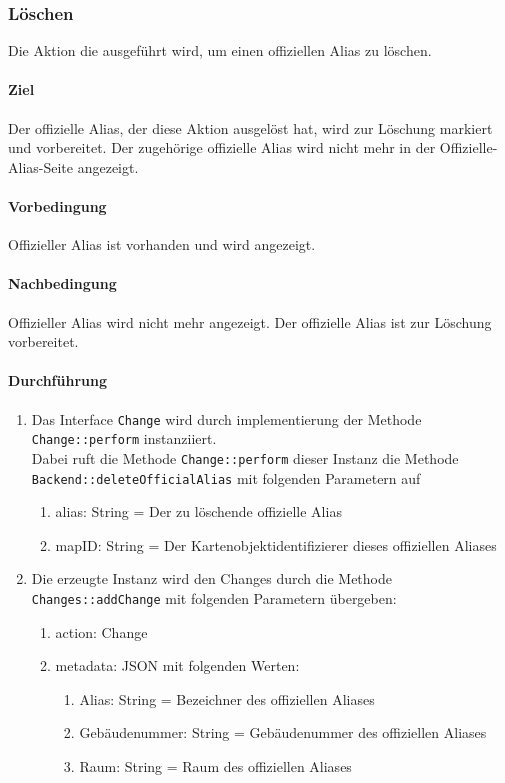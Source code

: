\subsubsection{Löschen}

Die Aktion die ausgeführt wird, um einen offiziellen Alias zu löschen.

\paragraph*{Ziel}
Der offizielle Alias, der diese Aktion ausgelöst hat, wird zur Löschung markiert und vorbereitet.
Der zugehörige offizielle Alias wird nicht mehr in der Offizielle-Alias-Seite angezeigt.

\paragraph*{Vorbedingung}
Offizieller Alias ist vorhanden und wird angezeigt.

\paragraph*{Nachbedingung}
Offizieller Alias wird nicht mehr angezeigt. Der offizielle Alias ist zur Löschung vorbereitet.

\paragraph*{Durchführung}
\begin{enumerate}
    \item Das Interface \verb#Change# wird durch implementierung der Methode \verb#Change::perform# instanziiert. \\
          Dabei ruft die Methode \verb#Change::perform# dieser Instanz die Methode \verb#Backend::deleteOfficialAlias# mit folgenden Parametern auf \begin{enumerate}
              \item alias: String = Der zu löschende offizielle Alias
              \item mapID: String = Der Kartenobjektidentifizierer dieses offiziellen Aliases
          \end{enumerate}
    \item Die erzeugte Instanz wird den Changes durch die Methode \verb#Changes::addChange# mit folgenden Parametern übergeben: \begin{enumerate}
        \item action: Change
        \item metadata: JSON mit folgenden Werten: \begin{enumerate}
            \item Alias: String = Bezeichner des offiziellen Aliases
            \item Gebäudenummer: String = Gebäudenummer des offiziellen Aliases
            \item Raum: String = Raum des offiziellen Aliases
        \end{enumerate}
    \end{enumerate}
\end{enumerate}